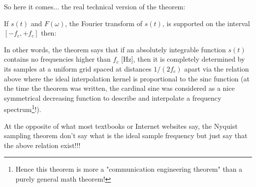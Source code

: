 	So here it comes... the real technical version of the theorem:
	\begin{theorem}
	If $s(t)$ and $F(\omega)$, the Fourier transform of $s(t)$, is supported on the interval $[-f_c,+f_c]$ then:
	
	In other words, the theorem says that if an absolutely integrable function $s(t)$ contains no frequencies higher than $f_c$ [Hz], then it is completely determined by its samples at a uniform grid spaced at distances $1/(2f_c)$ apart via the relation above where the ideal interpolation kernel is proportional to the $\mathrm{sinc}$ function (at the time the theorem was written, the cardinal sine was considered as a nice symmetrical decreasing function to describe and interpolate a frequency spectrum\footnote{Hence this theorem is more a "communication engineering theorem" than a purely general math theorem!}!).
	
	\end{theorem}
	\begin{tcolorbox}[title=Remark,colframe=black,arc=10pt]
	At the opposite of what most textbooks or Internet websites say, the Nyquist sampling theorem don't say what is the ideal sample frequency but just say that the above relation exist!!!
	\end{tcolorbox}
	
